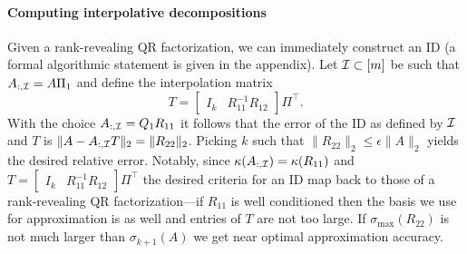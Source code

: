 \paragraph{Computing interpolative decompositions}
Given a rank-revealing QR factorization, we can immediately construct an ID (a formal algorithmic statement is given in the appendix).
Let $\mathcal{I}\subset [m]$ be such that $A_{:,\mathcal{I}} = A \Pi_1$ and define the interpolation matrix
\begin{equation*}
    T = 
    \begin{bmatrix}
    I_k & R_{11}^{-1} R_{12}
    \end{bmatrix}
    \Pi^\top.
\end{equation*}
With the choice $A_{:,\mathcal{I}} = Q_1 R_{11}$ it follows that the error of the ID as defined by $\mathcal{I}$ and $T$ is 
$%
    \|A - A_{:,\I}T\|_2
    = \|R_{22}\|_2 
$. %
Picking $k$ such that $\|R_{22}\|_2\leq \epsilon \|A\|_2$ yields the desired relative error. Notably, since $\kappa(A_{:,\mathcal{I}}) = \kappa(R_{11})$ and $T = 
\begin{bmatrix}
I_k & R_{11}^{-1} R_{12}
\end{bmatrix}
\Pi^\top$ 
the desired criteria for an ID map back to those of a rank-revealing QR factorization---if $R_{11}$ is well conditioned then the  basis we use for approximation is as well and entries of $T$ are not too large.
If $\sigma_{\max}(R_{22})$ is not much larger than $\sigma_{k+1}(A)$ we get near optimal approximation accuracy.







